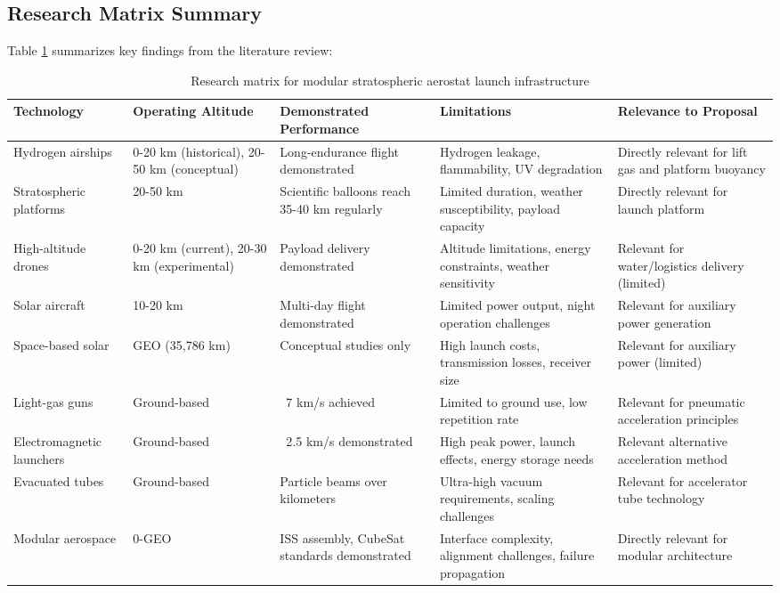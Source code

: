 \subsection{Research Matrix Summary}
Table \ref{tab:research_matrix} summarizes key findings from the literature review:

\begin{table}[htbp]
\centering
\caption{Research matrix for modular stratospheric aerostat launch infrastructure}
\label{tab:research_matrix}
\begin{tabular}{lp{3cm}p{2cm}p{3cm}p{3cm}}
\toprule
Technology & Operating Altitude & Demonstrated Performance & Limitations & Relevance to Proposal \\
\midrule
Hydrogen airships & 0-20 km (historical), 20-50 km (conceptual) & Long-endurance flight demonstrated & Hydrogen leakage, flammability, UV degradation & Directly relevant for lift gas and platform buoyancy \\
Stratospheric platforms & 20-50 km & Scientific balloons reach 35-40 km regularly & Limited duration, weather susceptibility, payload capacity & Directly relevant for launch platform \\
High-altitude drones & 0-20 km (current), 20-30 km (experimental) & Payload delivery demonstrated & Altitude limitations, energy constraints, weather sensitivity & Relevant for water/logistics delivery (limited) \\
Solar aircraft & 10-20 km & Multi-day flight demonstrated & Limited power output, night operation challenges & Relevant for auxiliary power generation \\
Space-based solar & GEO (35,786 km) & Conceptual studies only & High launch costs, transmission losses, receiver size & Relevant for auxiliary power (limited) \\
Light-gas guns & Ground-based & ~7 km/s achieved & Limited to ground use, low repetition rate & Relevant for pneumatic acceleration principles \\
Electromagnetic launchers & Ground-based & ~2.5 km/s demonstrated & High peak power, launch effects, energy storage needs & Relevant alternative acceleration method \\
Evacuated tubes & Ground-based & Particle beams over kilometers & Ultra-high vacuum requirements, scaling challenges & Relevant for accelerator tube technology \\
Modular aerospace & 0-GEO & ISS assembly, CubeSat standards demonstrated & Interface complexity, alignment challenges, failure propagation & Directly relevant for modular architecture \\
\bottomrule
\end{tabular}
\end{table}


